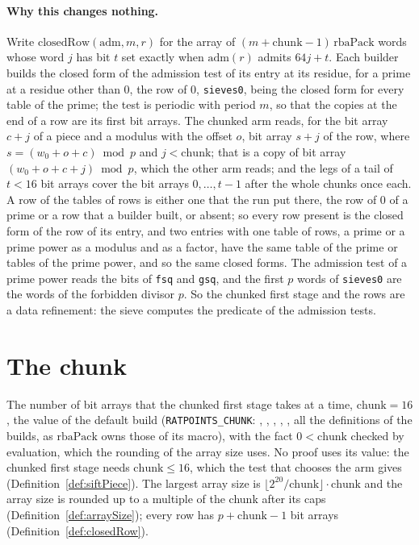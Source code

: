 \paragraph{Why this changes nothing.} Write $\mathrm{closedRow}(\mathrm{adm}, m, r)$ for the array
of $(m + \mathrm{chunk} - 1)\,\mathrm{rbaPack}$ words whose word $j$ has bit $t$ set exactly when
$\mathrm{adm}(r)$ admits $64 j + t$. Each builder builds the closed form of the admission test of
its entry at its residue, for a prime at a residue other than $0$, the row of $0$, \verb|sieves0|,
being the closed form for every table of the prime; the test is periodic with period $m$, so that
the copies at the end of a row are its first bit arrays. The chunked arm reads, for the bit array $c
+ j$ of a piece and a modulus with the offset $o$, bit array $s + j$ of the row, where $s = (w_0 + o
+ c) \bmod p$ and $j < \mathrm{chunk}$; that is a copy of bit array $(w_0 + o + c + j) \bmod p$,
which the other arm reads; and the legs of a tail of $t < 16$ bit arrays cover the bit arrays $0,
\dots, t - 1$ after the whole chunks once each. A row of the tables of rows is either one that the
run put there, the row of $0$ of a prime or a row that a builder built, or absent; so every row
present is the closed form of the row of its entry, and two entries with one table of rows, a prime
or a prime power as a modulus and as a factor, have the same table of the prime or tables of the
prime power, and so the same closed forms. The admission test of a prime power reads the bits of
\verb|fsq| and \verb|gsq|, and the first $p$ words of \verb|sieves0| are the words of the forbidden
divisor $p$. So the chunked first stage and the rows are a data refinement: the sieve computes the
predicate of the admission tests.

\section{The chunk}\label{sec:chunkConstants}

\begin{definition}\label{def:chunk}
  \leanok
  The number of bit arrays that the chunked first stage takes at a time, $\mathrm{chunk} = 16$, the
  value of the default build (\verb|RATPOINTS_CHUNK|: ,
  , ,
  , , all the definitions of the
  builds, as $\mathrm{rbaPack}$ owns those of its macro), with the fact $0 < \mathrm{chunk}$ checked
  by evaluation, which the rounding of the array size uses. No proof uses its value: the chunked
  first stage needs $\mathrm{chunk} \le 16$, which the test that chooses the arm gives
  (Definition~\ref{def:siftPiece}). The largest array size is
  $\lfloor 2^{20}/\mathrm{chunk} \rfloor \cdot \mathrm{chunk}$ and the array size is rounded up to a
  multiple of the chunk after its caps (Definition~\ref{def:arraySize}); every row has
  $p + \mathrm{chunk} - 1$ bit arrays (Definition~\ref{def:closedRow}).
\end{definition}

